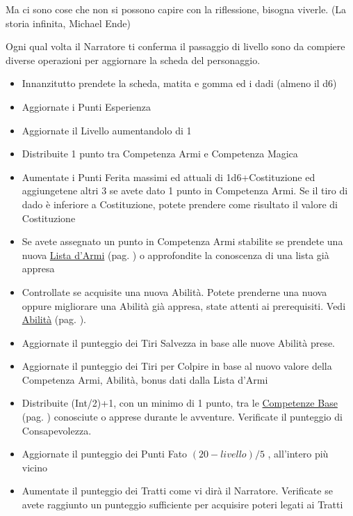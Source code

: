 \begin{multicols}{2}
\begin{changemargin}{0.3cm}{0.3cm}\begin{enfasi}{
Ma ci sono cose che non si possono capire con la riflessione, bisogna viverle. (La storia infinita, Michael Ende)
}\end{enfasi}\end{changemargin}


Ogni qual volta il Narratore ti conferma il passaggio di livello sono da compiere diverse operazioni per aggiornare la scheda del personaggio.

\begin{itemize}[leftmargin=*] \setlength{\itemsep}{0pt}
\item Innanzitutto prendete la scheda, matita e gomma ed i dadi (almeno il d6)
\item Aggiornate i Punti Esperienza
\item Aggiornate il Livello aumentandolo di 1
\item Distribuite 1 punto tra Competenza Armi e Competenza Magica
\item Aumentate i Punti Ferita massimi ed attuali di 1d6+Costituzione ed aggiungetene altri 3 se avete dato 1 punto in Competenza Armi. Se il tiro di dado è inferiore a Costituzione, potete prendere come risultato il valore di Costituzione
\item Se avete assegnato un punto in Competenza Armi stabilite se prendete una nuova \hyperlink{lista.armi}{Lista d'Armi} (pag. \pageref{lista.armi}) o approfondite la conoscenza di una lista già appresa
\item Controllate se acquisite una nuova Abilità. Potete prenderne una nuova oppure migliorare una Abilità già appresa, state attenti ai prerequisiti. Vedi \hyperlink{abilita}{Abilità} (pag. \pageref{abilita}).
\item Aggiornate il punteggio dei Tiri Salvezza in base alle nuove Abilità prese.
\item Aggiornate il punteggio dei Tiri per Colpire in base al nuovo valore della Competenza Armi, Abilità, bonus dati dalla Lista d'Armi
\item Distribuite (Int/2)+1, con un minimo di 1 punto, tra le \hyperlink{competenzeelenco}{Competenze Base} (pag. \pageref{competenzeelenco}) conosciute o apprese durante le avventure. Verificate il punteggio di Consapevolezza.
\item Aggiornate il punteggio dei Punti Fato $(20-livello)/5$ , all'intero più vicino
\item Aumentate il punteggio dei Tratti come vi dirà il Narratore. Verificate se avete raggiunto un punteggio sufficiente per acquisire poteri legati ai Tratti

\end{itemize}
\end{multicols}
